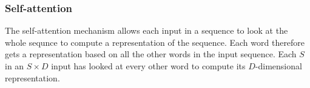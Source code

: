 \documentclass[11pt]{article}
\begin{document}
\subsubsection{Self-attention}

The self-attention mechanism allows each input in a sequence to look at the whole sequnce to compute a representation of the sequence. Each word therefore gets a representation based on all the other words in the input sequence. Each $S$ in an $S\times D$ input has looked at every other word to compute its $D$-dimensional representation.

\begin{minipage}[l]{.5\linewidth}
    \begin{figure}[H]
        \centering
    \end{figure}
\end{minipage}\hfill
\end{document}
